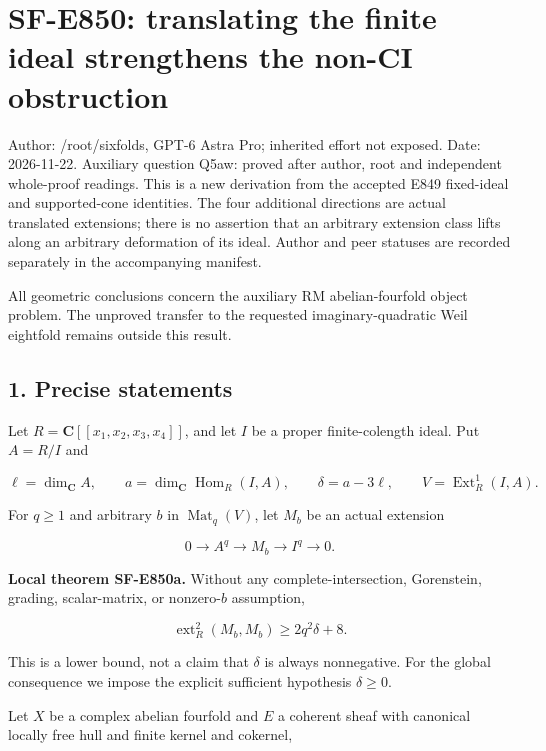 \section{SF-E850: translating the finite ideal strengthens the non-CI obstruction}\label{SF-E850:section}

Author: /root/sixfolds, GPT-6 Astra Pro; inherited effort not exposed.
Date: 2026-11-22. Auxiliary question Q5aw: proved after author, root and independent whole-proof readings.
This is a new derivation from the accepted E849 fixed-ideal and supported-cone
identities. The four additional directions are actual translated extensions;
there is no assertion that an arbitrary extension class lifts along an
arbitrary deformation of its ideal. Author and peer statuses are recorded
separately in the accompanying manifest.

All geometric conclusions concern the auxiliary RM abelian-fourfold object
problem. The unproved transfer to the requested imaginary-quadratic Weil
eightfold remains outside this result.

\subsection{1. Precise statements}\label{SF-E850:s1}

Let \(R=\mathbf C[[x_1,x_2,x_3,x_4]]\), and let \(I\) be a proper finite-colength ideal.
Put \(A=R/I\) and

\[
 \ell=\dim_{\mathbf C}A,\qquad
 a=\dim_{\mathbf C}\operatorname{Hom}_R(I,A),\qquad
 \delta=a-3\ell,
 \qquad V=\operatorname{Ext}^1_R(I,A).
 \tag{TR.1}
\]

For \(q\ge 1\) and arbitrary \(b\) in \(\operatorname{Mat}_q(V)\), let \(M_b\) be an actual extension

\[
 0\longrightarrow A^q\longrightarrow M_b\longrightarrow I^q
       \longrightarrow0.
 \tag{TR.2}
\]

\textbf{Local theorem SF-E850a.} Without any complete-intersection, Gorenstein,
grading, scalar-matrix, or nonzero-\(b\) assumption,

\[
       \operatorname{ext}^2_R(M_b,M_b)
                    \ge 2q^2\delta+8.
 \tag{TR.3}
\]

This is a lower bound, not a claim that \(\delta\) is always nonnegative.
For the global consequence we impose the explicit sufficient hypothesis
\(\delta\ge0\).

Let \(X\) be a complex abelian fourfold and \(E\) a coherent sheaf with canonical
locally free hull and finite kernel and cokernel,

